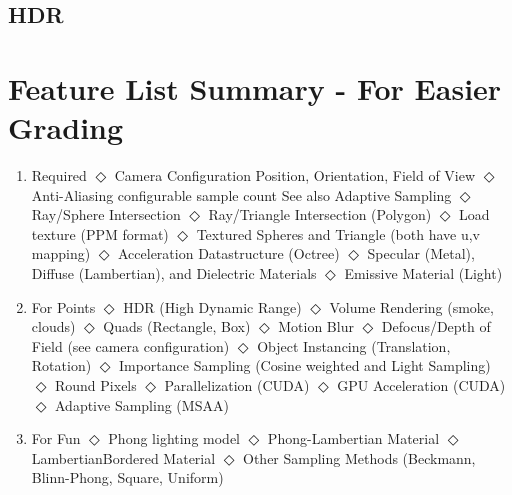 \documentclass{article}
\def\sitem{\subitem $\Diamond$ }
\let\ssitem\subsubitem
\begin{document}
    \subsection{HDR}

\pagebreak
\section{Feature List Summary - For Easier Grading}

\begin{enumerate}[\quad]
    \item Required 
        \sitem Camera Configuration
            \ssitem Position, Orientation, Field of View
        \sitem Anti-Aliasing
            \ssitem configurable sample count 
            \ssitem See also Adaptive Sampling
        \sitem Ray/Sphere Intersection
        \sitem Ray/Triangle Intersection (Polygon)
        \sitem Load texture (PPM format)
        \sitem Textured Spheres and Triangle (both have u,v mapping)
        \sitem Acceleration Datastructure (Octree)
        \sitem Specular (Metal), Diffuse (Lambertian), and Dielectric Materials 
        \sitem Emissive Material (Light)
    \item For Points
        \sitem HDR (High Dynamic Range) 
        \sitem Volume Rendering (smoke, clouds)
        \sitem Quads (Rectangle, Box)
        \sitem Motion Blur 
        \sitem Defocus/Depth of Field (see camera configuration)
        \sitem Object Instancing (Translation, Rotation)
        \sitem Importance Sampling (Cosine weighted and Light Sampling)
        \sitem Round Pixels 
        \sitem Parallelization (CUDA)
        \sitem GPU Acceleration (CUDA)
        \sitem Adaptive Sampling (MSAA)   
    \item For Fun
        \sitem Phong lighting model 
        \sitem Phong-Lambertian Material
        \sitem LambertianBordered Material
        \sitem Other Sampling Methods (Beckmann, Blinn-Phong, Square, Uniform)   

\end{enumerate}
\end{document}
